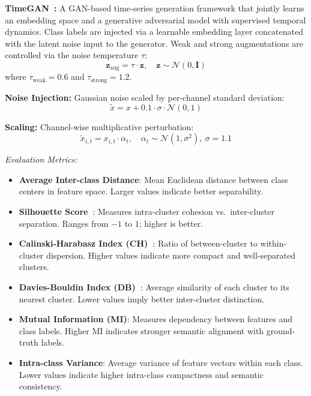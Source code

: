 \documentclass[lettersize,journal]{IEEEtran}
\begin{document}
{{\begin{itemize}
    {\color{R2color}
    \item \textbf{TimeGAN~\cite{yoon2019timegan}:} A GAN-based time-series generation framework that jointly learns an embedding space and a generative adversarial model with supervised temporal dynamics. Class labels are injected via a learnable embedding layer concatenated with the latent noise input to the generator. Weak and strong augmentations are controlled via the noise temperature $\tau$:
    \[
        \mathbf{z}_{\text{aug}} = \tau \cdot \mathbf{z}, \quad \mathbf{z} \sim \mathcal{N}(0, \mathbf{I})
    \]
    where $\tau_{\text{weak}} = 0.6$ and $\tau_{\text{strong}} = 1.2$.
    }

    \item \textbf{Noise Injection:} Gaussian noise scaled by per-channel standard deviation:
    \[
        \tilde{x} = x + 0.1 \cdot \sigma \cdot \mathcal{N}(0, 1)
    \]

    \item \textbf{Scaling:} Channel-wise multiplicative perturbation:
    \[
        \tilde{x}_{i,t} = x_{i,t} \cdot \alpha_t, \quad \alpha_t \sim \mathcal{N}(1, \sigma^2),\ \sigma = 1.1
    \]
\end{itemize}

\noindent\textit{Evaluation Metrics:}
\begin{itemize}
    \item \textbf{Average Inter-class Distance}: Mean Euclidean distance between class centers in feature space. Larger values indicate better separability.
    \item \textbf{Silhouette Score~\cite{rousseeuw1987silhouettes}}: Measures intra-cluster cohesion vs.\ inter-cluster separation. Ranges from $-1$ to $1$; higher is better.
    \item \textbf{Calinski-Harabasz Index (CH)~\cite{calinski1974dendrite}}: Ratio of between-cluster to within-cluster dispersion. Higher values indicate more compact and well-separated clusters.
    \item \textbf{Davies-Bouldin Index (DB)~\cite{davies2009cluster}}: Average similarity of each cluster to its nearest cluster. Lower values imply better inter-cluster distinction.
    \item \textbf{Mutual Information (MI)}: Measures dependency between features and class labels. Higher MI indicates stronger semantic alignment with ground-truth labels.
    \item \textbf{Intra-class Variance}: Average variance of feature vectors within each class. Lower values indicate higher intra-class compactness and semantic consistency.
\end{itemize}

}


}



\end{document}
